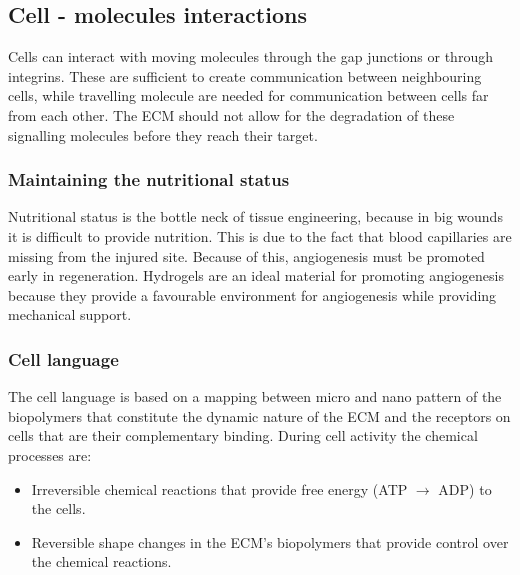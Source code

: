 	\subsection{Cell - molecules interactions}
	Cells can interact with moving molecules through the gap junctions or through integrins.
	These are sufficient to create communication between neighbouring cells, while travelling molecule are needed for communication between cells far from each other.
	The ECM should not allow for the degradation of these signalling molecules before they reach their target.

		\subsubsection{Maintaining the nutritional status}
		Nutritional status is the bottle neck of tissue engineering, because in big wounds it is difficult to provide nutrition.
		This is due to the fact that blood capillaries are missing from the injured site.
		Because of this, angiogenesis must be promoted early in regeneration.
		Hydrogels are an ideal material for promoting angiogenesis because they provide a favourable environment for angiogenesis while providing mechanical support.

		\subsubsection{Cell language}
		The cell language is based on a mapping between micro and nano pattern of the biopolymers that constitute the dynamic nature of the ECM and the receptors on cells that are their complementary binding.
		During cell activity the chemical processes are:

		\begin{multicols}{2}
			\begin{itemize}
				\item Irreversible chemical reactions that provide free energy (ATP $\rightarrow$ ADP) to the cells.
				\item Reversible shape changes in the ECM's biopolymers that provide control over the chemical reactions.
			\end{itemize}
		\end{multicols}


